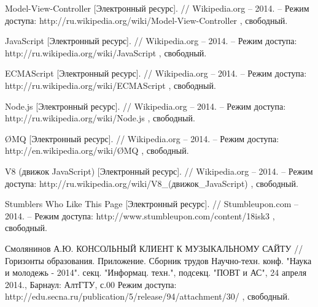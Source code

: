 \begin{thebibliography}{00}
  Model-View-Controller
  [Электронный ресурс]. //
  Wikipedia.org
  -- 2014. -- Режим доступа:
  http://ru.wikipedia.org/wiki/Model-View-Controller
  , свободный.

  JavaScript
  [Электронный ресурс]. //
  Wikipedia.org
  -- 2014. -- Режим доступа:
  http://ru.wikipedia.org/wiki/JavaScript
  , свободный.

  
  ECMAScript
  [Электронный ресурс]. //
  Wikipedia.org
  -- 2014. -- Режим доступа:
  http://ru.wikipedia.org/wiki/ECMAScript
  , свободный.

  
  Node.js
  [Электронный ресурс]. //
  Wikipedia.org
  -- 2014. -- Режим доступа:
  http://ru.wikipedia.org/wiki/Node.js
  , свободный.

    ØMQ  
  [Электронный ресурс]. //
  Wikipedia.org
  -- 2014. -- Режим доступа:
  http://en.wikipedia.org/wiki/ØMQ
  , свободный.

  
  
  V8 (движок JavaScript)
  [Электронный ресурс]. //
  Wikipedia.org
  -- 2014. -- Режим доступа:
  http://ru.wikipedia.org/wiki/V8\_(движок\_JavaScript)
  , свободный.

  Stumblers Who Like This Page
  [Электронный ресурс]. //
  Stumbleupon.com
  -- 2014. -- Режим доступа:
  http://www.stumbleupon.com/content/18isk3
  , свободный.

  Смолянинов А.Ю. КОНСОЛЬНЫЙ КЛИЕНТ К МУЗЫКАЛЬНОМУ САЙТУ // Горизонты образования. Приложение. Сборник
  трудов Научно-техн. конф. "Наука и молодежь - 2014". секц. "Информац. техн.",
  подсекц. "ПОВТ и АС", 24 апреля 2014., Барнаул: АлтГТУ,  с.00
  Режим доступа:
  http://edu.secna.ru/publication/5/release/94/attachment/30/
  , свободный.

\end{thebibliography}
\endgroup 


